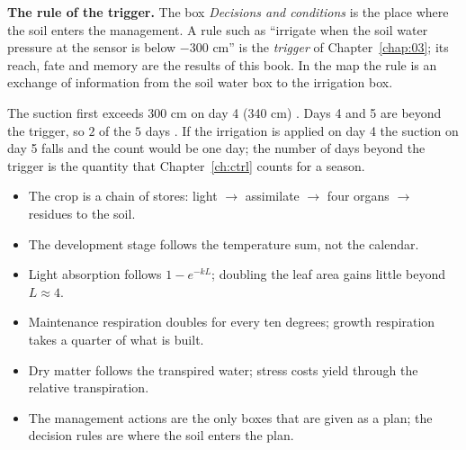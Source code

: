 \par\noindent\textbf{The rule of the trigger.} The box \emph{Decisions and conditions} is the place where the soil enters the management. A rule such as ``irrigate when the soil water pressure at the sensor is below $-300$ cm'' is the \emph{trigger} of Chapter~\ref{chap:03}; its reach, fate and memory are the results of this book. In the map the rule is an exchange of information from the soil water box to the irrigation box.

\sol {}
\par\noindent The suction first exceeds 300 cm on day 4 (340 cm) \finans. Days 4 and 5 are beyond the trigger, so $2$ of the $5$ days \finans. If the irrigation is applied on day 4 the suction on day 5 falls and the count would be one day; the number of days beyond the trigger is the quantity that Chapter~\ref{ch:ctrl} counts for a season.

\begin{itemize}
\item The crop is a chain of stores: light $\rightarrow$ assimilate $\rightarrow$ four organs $\rightarrow$ residues to the soil.
\item The development stage follows the temperature sum, not the calendar.
\item Light absorption follows $1-e^{-kL}$; doubling the leaf area gains little beyond $L\approx4$.
\item Maintenance respiration doubles for every ten degrees; growth respiration takes a quarter of what is built.
\item Dry matter follows the transpired water; stress costs yield through the relative transpiration.
\item The management actions are the only boxes that are given as a plan; the decision rules are where the soil enters the plan.
\end{itemize}

